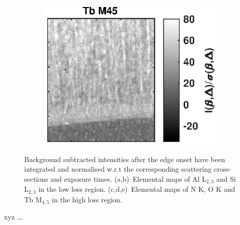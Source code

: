 \documentclass[%
 aip,
rsi,%
 amsmath,amssymb,
 reprint,%
]{revtex4-1}
\begin{document}
\begin{figure}
\begin{subfigure}{0.3\textwidth}
    	\includegraphics[width=\textwidth]{qTbMap}
        \subcaption{}
        \label{fig:qTbMap}
    \end{subfigure}
    \caption{Background subtracted intensities after the edge onset have been integrated and normalised w.r.t the corresponding scattering cross-sections and exposure times. (a,b)~Elemental maps of Al L$_{2,3}$ and Si L$_{2,3}$ in the low loss region. (c,d,e)~Elemental maps of N K, O K and Tb M$_{4,5}$ in the high loss region.}
    \label{fig:elemental_maps}
\end{figure}


\begin{acknowledgments}
xyz
\dots.
\end{acknowledgments}

\end{document}
